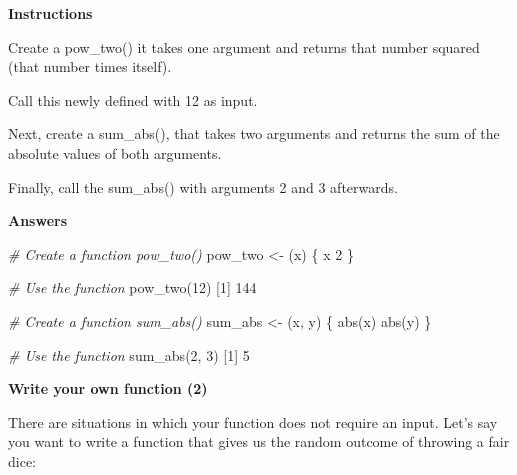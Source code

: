 \documentclass[]{article}
\newcommand{\hlnum}[1]{\textcolor[rgb]{0.816,0.125,0.439}{#1}}%
\newcommand{\hlstr}[1]{\textcolor[rgb]{0.251,0.627,0.251}{#1}}%
\newcommand{\hlcom}[1]{\textcolor[rgb]{0.502,0.502,0.502}{\textit{#1}}}%
\newcommand{\hlstd}[1]{\textcolor[rgb]{0.251,0.251,0.251}{#1}}%
\newcommand{\hlkwd}[1]{\textcolor[rgb]{0.878,0.439,0.125}{#1}}%
\newenvironment{Shaded}{\begin{myshaded}}{\end{myshaded}}
\newcommand{\KeywordTok}[1]{\hlkwd{#1}}
\newcommand{\DecValTok}[1]{\hlnum{#1}}
\newcommand{\StringTok}[1]{\hlstr{#1}}
\newcommand{\CommentTok}[1]{\hlcom{#1}}
\newcommand{\NormalTok}[1]{\hlstd{#1}}
\begin{document}
\textbf{Instructions}

\begin{Shaded}
\begin{Highlighting}[]
\OperatorTok{*}\StringTok{ }\NormalTok{Create a } \KeywordTok{pow_two}\NormalTok{()}\OperatorTok{:}\StringTok{ }\NormalTok{it takes one argument and returns that number }\KeywordTok{squared}\NormalTok{ (that number times itself).}

\OperatorTok{*}\StringTok{ }\NormalTok{Call this newly defined }\NormalTok{ with }\DecValTok{12}\NormalTok{ as input.}

\OperatorTok{*}\StringTok{ }\NormalTok{Next, create a } \KeywordTok{sum_abs}\NormalTok{(), that takes two arguments and returns the sum of the absolute values of both arguments.}

\OperatorTok{*}\StringTok{ }\NormalTok{Finally, call the } \KeywordTok{sum_abs}\NormalTok{() with arguments }\OperatorTok{-}\DecValTok{2}\NormalTok{ and }\DecValTok{3}\NormalTok{ afterwards.}
\end{Highlighting}
\end{Shaded}

\textbf{Answers}

\begin{Shaded}
\begin{Highlighting}[]
\CommentTok{# Create a function pow_two()}
\NormalTok{pow_two <-}\StringTok{ }\NormalTok{(x) \{}
\NormalTok{x }\OperatorTok{^}\StringTok{ }\DecValTok{2}
\NormalTok{\}}


\CommentTok{# Use the function}
\KeywordTok{pow_two}\NormalTok{(}\DecValTok{12}\NormalTok{)}
\NormalTok{   [}\DecValTok{1}\NormalTok{] }\DecValTok{144}

\CommentTok{# Create a function sum_abs()}
\NormalTok{sum_abs <-}\StringTok{ }\NormalTok{(x, y) \{}
\KeywordTok{abs}\NormalTok{(x) }\OperatorTok{+}\StringTok{ }\KeywordTok{abs}\NormalTok{(y)}
\NormalTok{\}}


\CommentTok{# Use the function}
\KeywordTok{sum_abs}\NormalTok{(}\OperatorTok{-}\DecValTok{2}\NormalTok{, }\DecValTok{3}\NormalTok{)}
\NormalTok{   [}\DecValTok{1}\NormalTok{] }\DecValTok{5}
\end{Highlighting}
\end{Shaded}

\textbf{Write your own function (2)}

There are situations in which your function does not require an input.
Let's say you want to write a function that gives us the random outcome
of throwing a fair dice:
\end{document}
